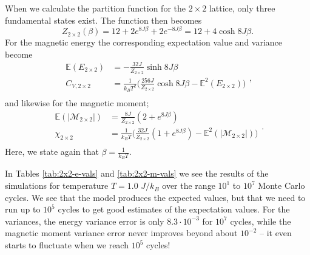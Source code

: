 \documentclass[]{article}
\begin{document}
When we calculate the partition function for the $2 \times 2$ lattice, only three fundamental states exist. The function then becomes
\begin{equation}
	Z_{2 \times 2} (\beta) = 12 + 2e^{8J \beta} + 2e^{-8J \beta} = 12 + 4\cosh 8J\beta.
\end{equation}
For the magnetic energy the corresponding expectation value and variance become
\begin{equation}
\begin{aligned}
	\mathbb{E}(E_{2 \times 2}) &= -\frac{32J}{Z_{2 \times 2}} \sinh 8J\beta \\
	C_{V, 2 \times 2} &= \frac{1}{k_B T^2} \bigg( \frac{256J}{Z_{2 \times 2}} \cosh 8J\beta - \mathbb{E}^2(E_{2 \times 2}) \bigg) \\
\end{aligned},
\end{equation}
and likewise for the magnetic moment; 
\begin{equation}
\begin{aligned}
	\mathbb{E}(|\mathcal{M}_{2 \times 2}|) &= \frac{8J}{Z_{2 \times 2}} (2 + e^{8J\beta}) \\
	\chi_{2 \times 2} &= \frac{1}{k_B T} \bigg( \frac{32J}{Z_{2 \times 2}} (1 + e^{8J\beta}) - \mathbb{E}^2(|\mathcal{M}_{2 \times 2}|) \bigg) \\
\end{aligned}.
\end{equation}
Here, we state again that $\beta = \frac{1}{k_B T}$.

In Tables \ref{tab:2x2-e-vals} and \ref{tab:2x2-m-vals} we see the results of the simulations for temperature $T=1.0$ $J/k_B$ over the range $10^1$ to $10^7$ Monte Carlo cycles. We see that the model produces the expected values, but that we need to run up to $10^5$ cycles to get good estimates of the expectation values. For the variances, the energy variance error is only $8.3 \cdot 10^{-3}$ for $10^7$ cycles, while the magnetic moment variance error never improves beyond about $10^{-2}$ -- it even starts to fluctuate when we reach $10^5$ cycles! 
\end{document}
